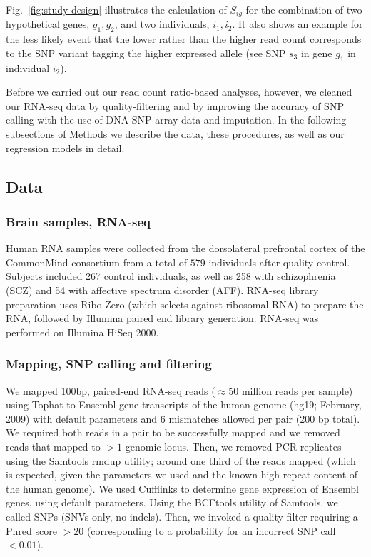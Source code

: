 \documentclass[letterpaper]{article}
\begin{document}
Fig.~\ref{fig:study-design} illustrates the calculation of \(S_{ig}\) for the
combination of two hypothetical genes, \(g_1,g_2\), and two individuals,
\(i_1,i_2\).  It also shows an example for the less likely event that the lower rather
than the higher read count corresponds to the SNP variant tagging the higher
expressed allele (see SNP \(s_3\) in gene \(g_1\) in individual \(i_2\)).

Before we carried out our read count ratio-based analyses, however, we cleaned
our RNA-seq data by quality-filtering and by improving the accuracy of SNP
calling with the use of DNA SNP array data and imputation. In the following
subsections of Methods we describe the data, these procedures, as well as our
regression models in detail.

\subsection{Data}

\subsubsection{Brain samples, RNA-seq}

Human RNA samples were collected from the dorsolateral prefrontal cortex of
the CommonMind consortium from a total of \(579\) individuals after
quality control. Subjects included 267 control individuals, as well as 258
with schizophrenia (SCZ) and 54 with affective spectrum disorder (AFF).
RNA-seq library preparation uses Ribo-Zero (which selects against ribosomal
RNA) to prepare the RNA, followed by Illumina paired end library generation.
RNA-seq was performed on Illumina HiSeq 2000.

\subsubsection{Mapping, SNP calling and filtering}

We mapped 100bp, paired-end RNA-seq reads (\(\approx50\) million reads per sample) using Tophat
to Ensembl gene transcripts of the human genome (hg19; February, 2009) with
default parameters and 6 mismatches allowed per pair (200 bp total). We
required both reads in a pair to be successfully mapped and we removed reads
that mapped to \(>1\) genomic locus. Then, we removed PCR replicates using the
Samtools rmdup utility; around one third of the reads mapped (which is
expected, given the parameters we used and the known high repeat content of
the human genome). We used Cufflinks to determine gene expression of Ensembl
genes, using default parameters. Using the BCFtools utility of Samtools, we
called SNPs (SNVs only, no indels). Then, we invoked a quality filter
requiring a Phred score \(>20\) (corresponding to a probability for an
incorrect SNP call \(<0.01\)).
\end{document}
